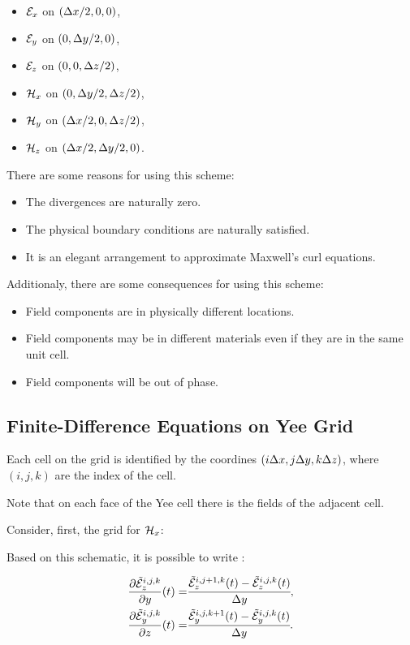 \begin{itemize}
    \item $\mathcal{E}_x$ on $(\Delta x/2, 0, 0)$,
    \item $\mathcal{E}_y$ on $(0, \Delta y/2, 0)$,
    \item $\mathcal{E}_z$ on $(0, 0, \Delta z/2)$,
    \item $\mathcal{H}_x$ on $(0, \Delta y/2, \Delta z/2)$,
    \item $\mathcal{H}_y$ on $(\Delta x/2, 0, \Delta z/2)$,
    \item $\mathcal{H}_z$ on $(\Delta x/2, \Delta y/2, 0)$.
\end{itemize}

There are some reasons for using this scheme:
\begin{itemize}
    \item The divergences are naturally zero.
    \item The physical boundary conditions are naturally satisfied.
    \item It is an elegant arrangement to approximate Maxwell's curl equations.
\end{itemize}

Additionaly, there are some consequences for using this scheme:
\begin{itemize}
    \item Field components are in physically different locations.
    \item Field components may be in different materials even if they are in the same unit cell.
    \item Field components will be out of phase.
\end{itemize}

\subsection{Finite-Difference Equations on Yee Grid}

Each cell on the grid is identified by the coordines $(i\Delta x, j\Delta y, k\Delta z)$, where $(i, j, k)$ are the index of the cell.

Note that on each face of the Yee cell there is the fields of the adjacent cell.

Consider, first, the grid for $\mathcal{H}_x$:



Based on this schematic, it is possible to write \cite{rumpf_book}:

\begin{eqnarray}
    \frac{\partial \tilde{\mathcal{E}}_z^{i,j,k}}{\partial y}(t) =& \cfrac{\tilde{\mathcal{E}}_z^{i, j+1, k}(t)-\tilde{\mathcal{E}}_z^{i, j, k}(t)}{\Delta y}, \\
    \frac{\partial \tilde{\mathcal{E}}_y^{i,j,k}}{\partial z}(t) =& \cfrac{\tilde{\mathcal{E}}_y^{i, j, k+1}(t)-\tilde{\mathcal{E}}_y^{i, j, k}(t)}{\Delta y}.
\end{eqnarray}

